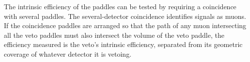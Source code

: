 The intrinsic efficiency of the paddles can be tested by requiring a coincidence with several paddles.  The several-detector coincidence identifies signals as muons.  If the coincidence paddles are arranged so that the path of any muon intersecting all the veto paddles must also intersect the volume of the veto paddle, the efficiency measured is the veto's intrinsic efficiency, separated from its geometric coverage of whatever detector it is vetoing.

